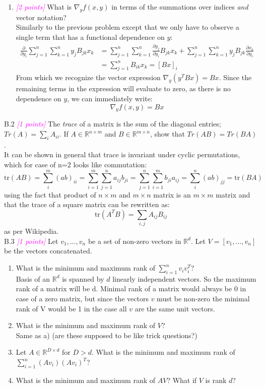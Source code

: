 \documentclass{article}
\newcommand{\1}{\mathbf{1}}
\newcommand{\points}[1]{\small\textcolor{magenta}{\emph{[#1 points]}} \normalsize}
\begin{document}
\begin{enumerate}
	\item \points{2} What is $\nabla_y f(x,y)$ in terms of the summations over indices \emph{and} vector notation?\\
	Similarly to the previous problem except that we only have to observe a single term that has a functional dependence on $y$: 
	\begin{align*}
	  \frac{\partial}{\partial y_i}\sum_{j=1}^n\sum_{k=1}^n y_jB_{jk}x_k &= 
	  \sum_{j=1}^n\sum_{k=1}^n \frac{\partial y_j}{\partial y_i}B_{jk}x_k +
	  \sum_{j=1}^n\sum_{k=1}^n y_jB_{jk}\frac{\partial x_k}{\partial y_i} \\
	  &= \sum_{j=1}^n B_{ik}x_k   = \left[Bx\right]_i
	\end{align*}
	From which we recognize the vector expression $\nabla_y (y^TBx) = Bx$. Since the remaining terms in the expression will evaluate to zero, as there is no dependence on $y$, we can immediately write:
	$$\nabla_y f(x,y) = Bx$$
\end{enumerate}

B.2 \points{1} The \textit{trace} of a matrix is the sum of the diagonal entries; $Tr(A) = \sum_i A_{ii}$. If $A\in\mathbb{R}^{n\times m}$ and $B\in\mathbb{R}^{m\times n}$, show that $Tr(AB) = Tr(BA)$.\\
It can be shown in general that trace is invariant under cyclic permutations, which for case of n=2 looks like commutation:
$$\text{tr}(AB)=\sum_i^m (ab)_{ii} = \sum_{i=1}^m\sum_{j=1}^n a_{ij}b_{ji}= \sum_{j=1}^n\sum_{i=1}^m b_{ji}a_{ij} = \sum_i^n (ab)_{jj} = \text{tr}(BA)$$
using the fact that product of $n\times m$ and $m\times n$ matrix is an $m\times m$ matrix and that the trace of a square matrix can be rewritten as:
$$\text{tr}(A^TB)=\sum_{i,j}A_{ij}B_{ij}$$
as per Wikipedia.\\

B.3 \points{1} Let $v_1,\dots,v_n$ be a set of non-zero vectors in $\mathbb{R}^d$. Let $V = [v_1,\dots,v_n]$ be the vectors concatenated. 
    \begin{enumerate}
        \item What is the minimum and maximum rank of $\sum_{i=1}^n v_i v_i^T$? \\
        Basis of an $\mathbb{R}^d$ is spanned by $d$ linearly independent vectors. So the maximum rank of a matrix will be d. Minimal rank of a matrix would always be 0 in case of a zero matrix, but since the vectors $v$ must be non-zero the minimal rank of V would be 1 in the case all $v$ are the same unit vectors. 
        \item What is the minimum and maximum rank of $V$? \\
        Same as a) (are these supposed to be like trick questions?)
        \item Let $A \in \mathbb{R}^{D \times d}$ for $D > d$. What is the minimum and maximum rank of $\sum_{i=1}^n (A v_i) (A v_i)^T$?
        \item What is the minimum and maximum rank of $AV$? What if $V$ is rank $d$?
    \end{enumerate}
\end{document}
